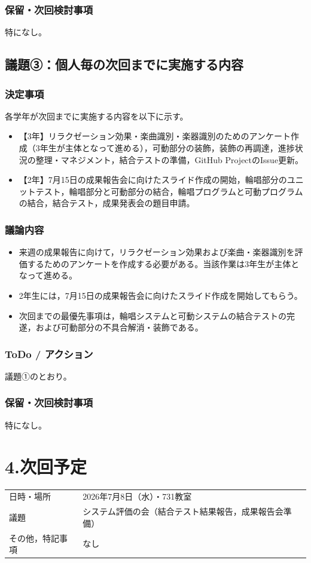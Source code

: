 \documentclass[a4paper,12pt]{ltjsarticle}
\begin{document}
\subsubsection*{保留・次回検討事項}
特になし。

\subsection*{議題③：個人毎の次回までに実施する内容}

\subsubsection*{決定事項}
各学年が次回までに実施する内容を以下に示す。
\begin{itemize}[leftmargin=1.5em]
  \item 【3年】リラクゼーション効果・楽曲識別・楽器識別のためのアンケート作成（3年生が主体となって進める），可動部分の装飾，装飾の再調達，進捗状況の整理・マネジメント，結合テストの準備，GitHub ProjectのIssue更新。
  \item 【2年】7月15日の成果報告会に向けたスライド作成の開始，輪唱部分のユニットテスト，輪唱部分と可動部分の結合，輪唱プログラムと可動プログラムの結合，結合テスト，成果発表会の題目申請。
\end{itemize}

\subsubsection*{議論内容}
\begin{itemize}[leftmargin=1.5em]
  \item 来週の成果報告に向けて，リラクゼーション効果および楽曲・楽器識別を評価するためのアンケートを作成する必要がある。当該作業は3年生が主体となって進める。
  \item 2年生には，7月15日の成果報告会に向けたスライド作成を開始してもらう。
  \item 次回までの最優先事項は，輪唱システムと可動システムの結合テストの完遂，および可動部分の不具合解消・装飾である。
\end{itemize}

\subsubsection*{ToDo / アクション}
議題①のとおり。

\subsubsection*{保留・次回検討事項}
特になし。

\section*{4.次回予定}
\begin{tabular}{ll}
  \toprule
  日時・場所 & 2026年7月8日（水）・731教室 \\
  議題       & システム評価の会（結合テスト結果報告，成果報告会準備）\\
  その他，特記事項 & なし \\
  \bottomrule
\end{tabular}
\end{document}
